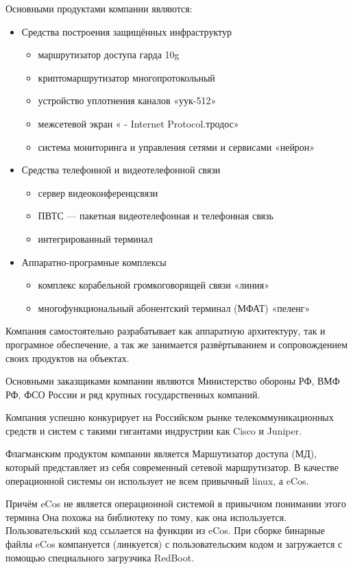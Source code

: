 \documentclass[14pt,a4paper]{extarticle}
\begin{document}
Основными продуктами компании являются:
\begin{itemize}
    \item Средства построения защищённых инфраструктур
    \begin{itemize}
        \item маршрутизатор доступа гарда 10g
        \item криптомаршрутизатор многопротокольный
        \item устройство уплотнения каналов «уук-512»
        \item межсетевой экран « - Internet Protocol.тродос»
        \item система мониторинга и управления сетями и сервисами «нейрон»
    \end{itemize}
    \item Средства телефонной и видеотелефонной связи
    \begin{itemize}
        \item сервер видеоконференцсвязи
        \item ПВТС — пакетная видеотелефонная и телефонная связь
        \item интегрированный терминал
    \end{itemize}
    \item Аппаратно-програмные комплексы
    \begin{itemize}
        \item комплекс корабельной громкоговорящей связи «линия»
        \item многофункциональный абонентский терминал (МФАТ) «пеленг»
    \end{itemize}
\end{itemize}

Компания самостоятельно разрабатывает  как аппаратную  архитектуру, так и програмное обеспечение, а так же занимается развёртыванием и сопровождением своих продуктов на объектах.

Основными заказщиками компании являются Министерство обороны РФ, ВМФ РФ, ФСО России и ряд крупных государственных компаний.

Компания успешно конкурирует на Российском рынке телекоммуникационных средств и систем с такими гигантами индрустрии как Cisco и Juniper.

Флагманским продуктом компании является Маршутизатор доступа (МД), который представляет из себя современный сетевой маршрутизатор. В качестве операционной системы он использует не всем привычный linux, а eCos.

Причём eCos не является операционной системой в привычном понимании этого термина Она похожа на библиотеку по тому, как она используется. Пользовательский код ссылается на функции из eCos. При сборке бинарные файлы eCos компануется (линкуется) с пользовательским кодом и загружается с помощью специального загрузчика RedBoot.
\end{document}
